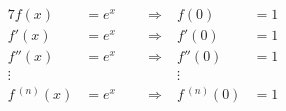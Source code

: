 \documentclass[oneside]{book}
\begin{document}

\begin{align*}
7f(x)&=e^x \qquad\Rightarrow & f(0)&=1 \\
f'(x)&=e^x \qquad\Rightarrow & f'(0)&=1 \\
f''(x)&=e^x \qquad\Rightarrow & f''(0)&=1 \\
\vdots && \vdots & \\
f\,^{(n)}(x)&=e^x \qquad\Rightarrow & f\,^{(n)}(0)&=1
\end{align*}
\end{document}
